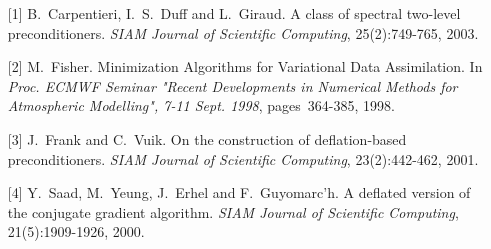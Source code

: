 \documentclass{report}
\begin{document}
\begin{enumerate}
\item[{[}1{]}] B.~Carpentieri, I.~S.~Duff and L.~Giraud.
A class of spectral two-level preconditioners.
{\em SIAM Journal of Scientific Computing},
25(2):749-765,
2003.

\item[{[}2{]}] M.~Fisher. Minimization Algorithms for Variational Data Assimilation.
In {\em Proc. ECMWF Seminar "Recent Developments in Numerical Methods for
Atmospheric Modelling",
7-11 Sept. 1998},
pages~364-385,
1998.

\item[{[}3{]}] J.~Frank and C.~Vuik. On the construction of
deflation-based preconditioners.
{\em SIAM Journal of Scientific Computing},
23(2):442-462,
2001.

\item[{[}4{]}] Y.~Saad, M.~Yeung, J.~Erhel and F.~Guyomarc'h.
A deflated version of the conjugate gradient algorithm.
{\em SIAM Journal of Scientific Computing},
21(5):1909-1926,
2000.

\end{enumerate}
\end{document}
